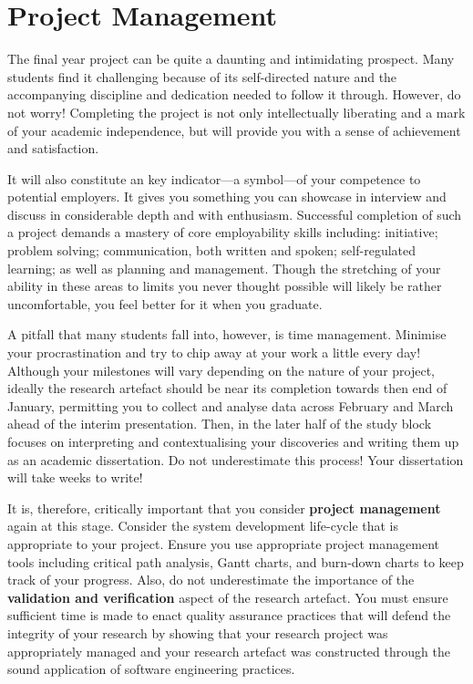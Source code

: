 \section*{Project Management}

The final year project can be quite a daunting and intimidating prospect. Many students find it challenging because of its self-directed nature and the accompanying discipline and dedication needed to follow it through. However, do not worry! Completing the project is not only intellectually liberating and a mark of your academic independence, but will provide you with a sense of achievement and satisfaction.

It will also constitute an key indicator---a symbol---of your competence to potential employers. It gives you something you can showcase in interview and discuss in considerable depth and with enthusiasm. Successful completion of such a project demands a mastery of core employability skills including: initiative; problem solving; communication, both written and spoken; self-regulated learning; as well as planning and management. Though the stretching of your ability in these areas to limits you never thought possible will likely be rather uncomfortable, you feel better for it when you graduate.

A pitfall that many students fall into, however, is time management. Minimise your procrastination and try to chip away at your work a little every day! Although your milestones will vary depending on the nature of your project, ideally the research artefact should be near its completion towards then end of January, permitting you to collect and analyse data across February and March ahead of the interim presentation. Then, in the later half of the study block focuses on interpreting and contextualising your discoveries and writing them up as an academic dissertation. Do not underestimate this process! Your dissertation will take weeks to write!

It is, therefore, critically important that you consider \textbf{project management} again at this stage. Consider the system development life-cycle that is appropriate to your project. Ensure you use appropriate project management tools including critical path analysis, Gantt charts, and burn-down charts to keep track of your progress. Also, do not underestimate the importance of the \textbf{validation and verification} aspect of the research artefact. You must ensure sufficient time is made to enact quality assurance practices that will defend the integrity of your research by showing that your research project was appropriately managed and your research artefact was constructed through the sound application of software engineering practices. 

